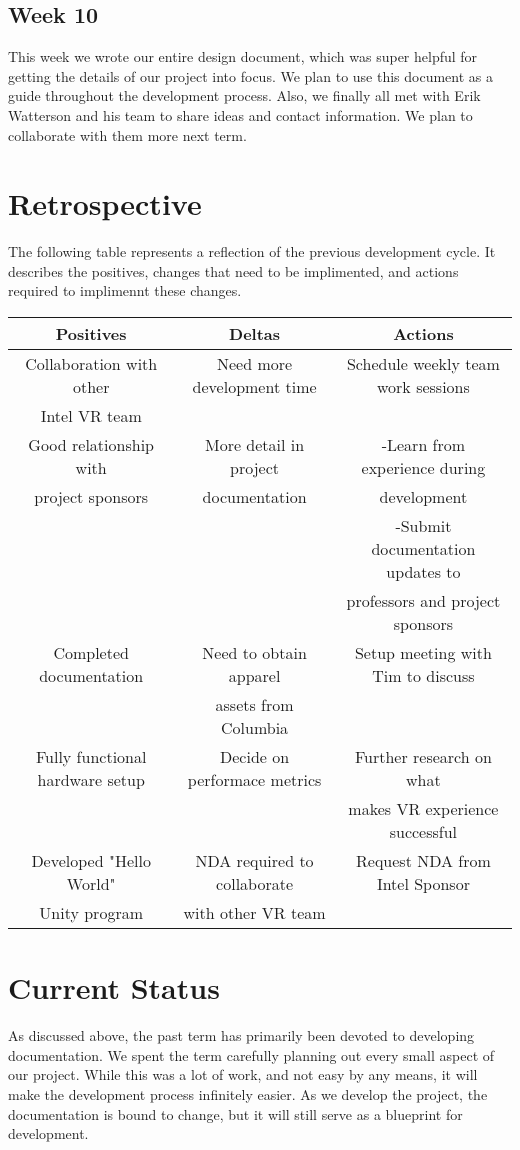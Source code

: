 \documentclass[10pt,journal,compsoc,onecolumn, draftclsnofoot]{IEEEtran}
\begin{document}
\subsection{Week 10}
This week we wrote our entire design document, which was super helpful for getting the details of our project into focus.
We plan to use this document as a guide throughout the development process.
Also, we finally all met with Erik Watterson and his team to share ideas and contact information.
We plan to collaborate with them more next term.

\section{Retrospective}
The following table represents a reflection of the previous development cycle.
It describes the positives, changes that need to be implimented, and actions required to implimennt these changes.

\begin{center}
\begin{tabular}{ |c || c | c | }
 \hline
 Positives & Deltas & Actions \\
 \hline \hline
 Collaboration with other & Need more development time & Schedule weekly team work sessions\\
 Intel VR team & & \\ \hline
 Good relationship with & More detail in project & -Learn from experience during \\ project sponsors & documentation & development \\
 & & -Submit documentation updates to \\
 & & professors and project sponsors\\ \hline
 Completed documentation & Need to obtain apparel & Setup meeting with Tim to discuss\\
 & assets from Columbia & \\ \hline
 Fully functional hardware setup & Decide on performace metrics & Further research on what\\
 & & makes VR experience successful\\ \hline
 Developed "Hello World" & NDA required to collaborate & Request NDA from Intel Sponsor \\
 Unity program & with other VR team & \\
 \hline
\end{tabular}
\end{center}
\section{Current Status}
As discussed above, the past term has primarily been devoted to developing documentation.
We spent the term carefully planning out every small aspect of our project.
While this was a lot of work, and not easy by any means, it will make the development process infinitely easier.
As we develop the project, the documentation is bound to change, but it will still serve as a blueprint for development.
\end{document}
